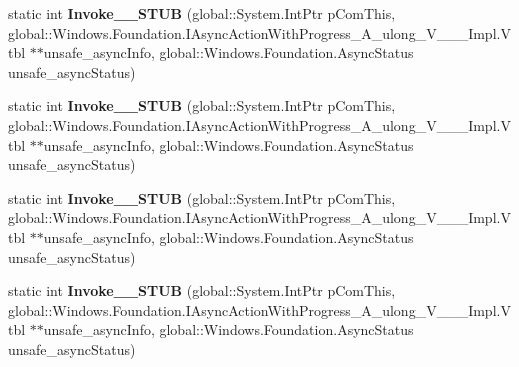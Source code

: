 \begin{DoxyCompactItemize}
\item 
\mbox{\label{struct_windows_1_1_foundation_1_1_async_action_with_progress_completed_handler___a__ulong___v_______impl_1_1_vtbl_ae5ff28298bdd095b0ecfd86fd13c7348}} 
static int {\bfseries Invoke\+\_\+\+\_\+\+S\+T\+UB} (global\+::\+System.\+Int\+Ptr p\+Com\+This, global\+::\+Windows.\+Foundation.\+I\+Async\+Action\+With\+Progress\+\_\+\+A\+\_\+ulong\+\_\+\+V\+\_\+\+\_\+\+\_\+\+Impl.\+Vtbl $\ast$$\ast$unsafe\+\_\+async\+Info, global\+::\+Windows.\+Foundation.\+Async\+Status unsafe\+\_\+async\+Status)
\item 
\mbox{\label{struct_windows_1_1_foundation_1_1_async_action_with_progress_completed_handler___a__ulong___v_______impl_1_1_vtbl_ae5ff28298bdd095b0ecfd86fd13c7348}} 
static int {\bfseries Invoke\+\_\+\+\_\+\+S\+T\+UB} (global\+::\+System.\+Int\+Ptr p\+Com\+This, global\+::\+Windows.\+Foundation.\+I\+Async\+Action\+With\+Progress\+\_\+\+A\+\_\+ulong\+\_\+\+V\+\_\+\+\_\+\+\_\+\+Impl.\+Vtbl $\ast$$\ast$unsafe\+\_\+async\+Info, global\+::\+Windows.\+Foundation.\+Async\+Status unsafe\+\_\+async\+Status)
\item 
\mbox{\label{struct_windows_1_1_foundation_1_1_async_action_with_progress_completed_handler___a__ulong___v_______impl_1_1_vtbl_ae5ff28298bdd095b0ecfd86fd13c7348}} 
static int {\bfseries Invoke\+\_\+\+\_\+\+S\+T\+UB} (global\+::\+System.\+Int\+Ptr p\+Com\+This, global\+::\+Windows.\+Foundation.\+I\+Async\+Action\+With\+Progress\+\_\+\+A\+\_\+ulong\+\_\+\+V\+\_\+\+\_\+\+\_\+\+Impl.\+Vtbl $\ast$$\ast$unsafe\+\_\+async\+Info, global\+::\+Windows.\+Foundation.\+Async\+Status unsafe\+\_\+async\+Status)
\item 
\mbox{\label{struct_windows_1_1_foundation_1_1_async_action_with_progress_completed_handler___a__ulong___v_______impl_1_1_vtbl_ae5ff28298bdd095b0ecfd86fd13c7348}} 
static int {\bfseries Invoke\+\_\+\+\_\+\+S\+T\+UB} (global\+::\+System.\+Int\+Ptr p\+Com\+This, global\+::\+Windows.\+Foundation.\+I\+Async\+Action\+With\+Progress\+\_\+\+A\+\_\+ulong\+\_\+\+V\+\_\+\+\_\+\+\_\+\+Impl.\+Vtbl $\ast$$\ast$unsafe\+\_\+async\+Info, global\+::\+Windows.\+Foundation.\+Async\+Status unsafe\+\_\+async\+Status)

\end{DoxyCompactItemize}
